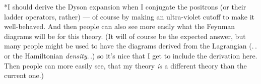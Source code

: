 \documentclass{report}
\begin{document}
*I should derive the Dyson expansion when I conjugate the positrons (or their ladder operators, rather) --- of course by making an ultra-violet cutoff to make it well-behaved. And then people can also see more easily what the Feynman diagrams will be for this theory. (It will of course be the expected answer, but many people might be used to have the diagrams derived from the Lagrangian (.\,. or the Hamiltonian \emph{density}.\,.) so it's nice that I get to include the derivation here. Then people can more easily see, that my theory \emph{is} a different theory than the current one.)

\end{document}
